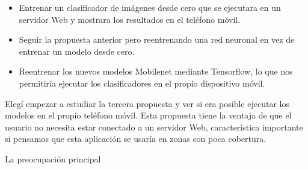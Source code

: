 \begin{itemize}
	\item Entrenar un clasificador de imágenes desde cero que se ejecutara en un servidor Web y mostrara los resultados en el teléfono móvil.
	\item Seguir la propuesta anterior pero reentrenando una red neuronal en vez de entrenar un modelo desde cero.
	\item Reentrenar los nuevos modelos Mobilenet mediante Tensorflow, lo que nos permitiría ejecutar los clasificadores en el propio dispositivo móvil.
\end{itemize}

Elegí empezar a estudiar la tercera propuesta y ver si era posible ejecutar los modelos en el propio teléfono móvil. Esta propuesta tiene la ventaja de que el usuario no necesita estar conectado a un servidor Web, característica importante si pensamos que esta aplicación se usaría en zonas con poca cobertura.

La preocupación principal 























